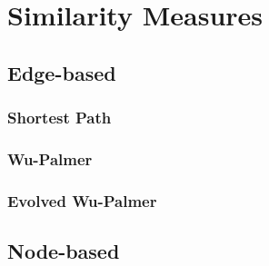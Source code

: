 
\chapter{Similarity Measures} %

\label{chapter:Measures} %



\section{Edge-based}

\subsection{Shortest Path} %
\label{ssub:shortest_path}


\subsection{Wu-Palmer} %
\label{ssub:wu_palmer}


\subsection{Evolved Wu-Palmer} %
\label{ssub:evolved_wu_palmer}




\section{Node-based}

